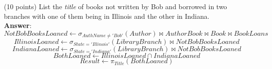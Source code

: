 \begin{questions}
\begin{choices}
	
	\choice(10 points) List the \textit{title} of books not written by Bob and borrowed in two branches with one of them being in Illinois and the other in Indiana. \\
    \textbf{Answer}:\\
    $$NotBobBooksLoaned \leftarrow \sigma_{AuthName \neq 'Bob'}(Author) \bowtie AuthorBook \bowtie Book \bowtie BookLoans$$
	$$IllinoisLoaned \leftarrow \sigma_{State='Illinois'}(LibraryBranch) \bowtie NotBobBooksLoaned$$
	$$IndianaLoaned \leftarrow \sigma_{State='Indiana'}(LibraryBranch) \bowtie NotBobBooksLoaned$$
	$$BothLoaned \leftarrow IllinoisLoaned \cap IndianaLoaned$$
	$$Result \leftarrow \pi_{Title}(BothLoaned)$$
	
\end{choices}

\end{questions}

